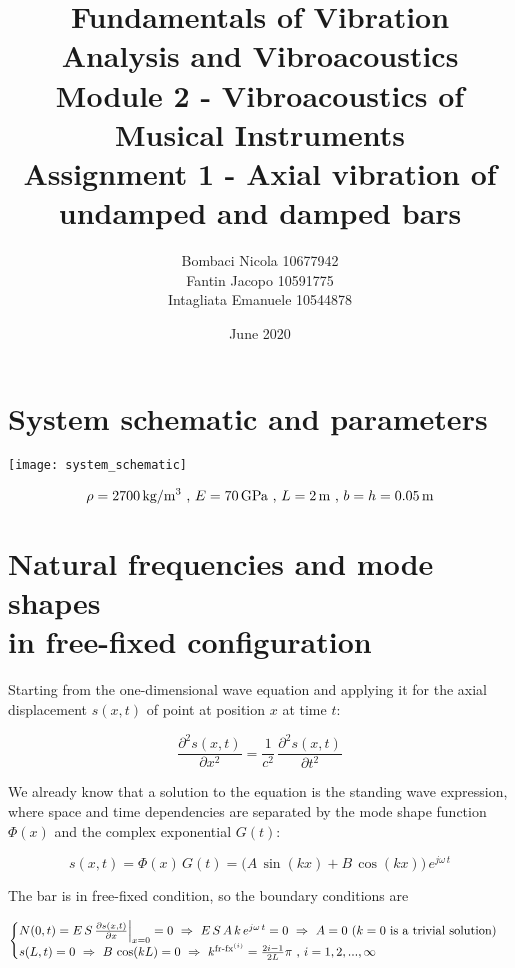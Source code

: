 \documentclass[a4paper,12pt,oneside]{article}
\title{Fundamentals of Vibration Analysis and Vibroacoustics \\
	Module 2 - Vibroacoustics of Musical Instruments \\
	Assignment 1 - Axial vibration of undamped and damped bars}
\author{Bombaci Nicola 10677942 \\
	Fantin Jacopo 10591775 \\
	Intagliata Emanuele 10544878}
\date{June 2020}
\begin{document}
\maketitle

\vspace{100pt}

\section*{System schematic and parameters}

\texttt{[image: system\_schematic]}

\vspace{30pt}

\[
	\rho = 2700 \, \text{kg/m\textsuperscript{3}} ~ \text{,} ~ E = 70 \, \text{GPa} %
		~ \text{,} ~ L = 2 \, \text{m} ~ \text{,} ~ b = h = 0.05 \, \text{m}
\]

\clearpage


\section{Natural frequencies and mode shapes \\ in free-fixed configuration}
\label{sec:nat_freqs_and_mode_shapes_free_fixed}

Starting from the one-dimensional wave equation and applying it for the axial displacement $ s(x,t) $ of point at position $ x $ at time $ t $:

\[
	\frac{\partial^2 s(x,t)}{\partial x^2} = %
		\frac{1}{c^2} \, \frac{\partial^2 s(x,t)}{\partial t^2}
\]

We already know that a solution to the equation is the standing wave expression, where space and time dependencies are separated by the mode shape function $ \Phi(x) $ and the complex exponential $ G(t) $:

\[
	s(x,t) = \Phi(x) \, G(t) = %
		\bigl(A \, \sin(kx) + B \, \cos(kx)\bigl) \, e^{j \omega \, t}
\]

\vspace{10pt}

The bar is in free-fixed condition, so the boundary conditions are

\[ \begin{cases}
	N(0,t) = E \, S \, \frac{\partial s(x,t)}{\partial x} \Big|_{x=0} = 0 %
		~ \Rightarrow ~ E \, S \, A \, k \, e^{j \omega \, t} = 0 %
		~ \Rightarrow ~ A = 0 ~ \text{($ k = 0 $ is a trivial solution)} \\
	s(L,t) = 0 ~ \Rightarrow ~ B \, \cos(kL) = 0 ~ \Rightarrow ~ %
		k^{\textup{fr-fx}^{(i)}} = \frac{2i - 1}{2L} \pi %
		~ \text{,} ~ i = 1,2,...,\infty
\end{cases} \]
\end{document}
